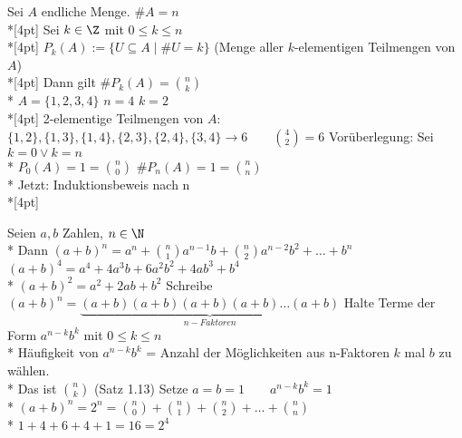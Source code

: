 Sei $A$ endliche Menge. $\#A=n$\\*[4pt]
Sei $k\in\Z$ mit $0\leq k\leq n$\\*[4pt]
$P_k(A):=\{U\subseteq A\mid \#U=k\}$ (Menge aller $k$-elementigen Teilmengen von $A$)\\*[4pt]
Dann gilt $\#P_k(A)=\binom{n}{k}$\\*
\bsp
$A=\{1,2,3,4\}$ $n=4$ $k=2$\\*[4pt]
2-elementige Teilmengen von $A$:
$\{1,2\}, \{1,3\}, \{1,4\}, \{2,3\}, \{2,4\}, \{3,4\} \to 6\qquad \binom{4}{2}=6$ \ok
%
\bew
Vorüberlegung: Sei $k=0 \vee k=n$\\*
$P_0(A)=1=\binom{n}{0}$ $\#P_n(A)=1=\binom{n}{n}$\ok\\*
Jetzt: Induktionsbeweis nach n\\*[4pt]

Seien $a,b$ Zahlen, $n\in\N$\\*
Dann $(a+b)^n=a^n+\binom{n}{1} a^{n-1} b+\binom{n}{2}a^{n-2}b^2+…+b^n$
%
\bsp
$(a+b)^4=a^4+4a^3b+6a^2b^2+4ab^3+b^4$\\*
$(a+b)^2=a^2+2ab+b^2$
%
\bew
Schreibe $(a+b)^n=\underbrace{(a+b)(a+b)(a+b)(a+b)…(a+b)}_{n-Faktoren}$
%
Halte Terme der Form $a^{n-k}b^k$ mit $0\leq k\leq n$\\*
Häufigkeit von $a^{n-k}b^k$ = Anzahl der Möglichkeiten aus n-Faktoren $k$ mal $b$ zu wählen.\\*
Das ist $\binom{n}{k}$ (Satz 1.13)
%
Setze $a=b=1\qquad a^{n-k}b^k=1$\\*
$(a+b)^n=2^n=\binom{n}{0}+\binom{n}{1}+\binom{n}{2}+…+\binom{n}{n}$\\*
%
\bsp
$1+4+6+4+1=16=2^4$

